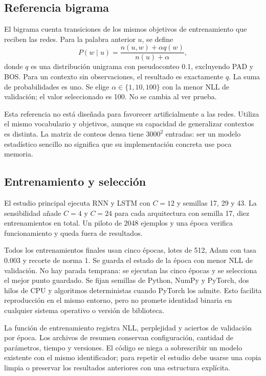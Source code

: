 \subsection{Referencia bigrama}
El bigrama cuenta transiciones de los mismos objetivos de entrenamiento
que reciben las redes. Para la palabra anterior $u$, se define
\begin{equation}
 P(w\mid u)=\frac{n(u,w)+\alpha q(w)}{n(u)+\alpha},
\end{equation}
donde $q$ es una distribución unigrama con pseudoconteo 0.1,
excluyendo PAD y BOS. Para un contexto sin observaciones, el resultado
es exactamente $q$. La suma de probabilidades es uno. Se elige
$\alpha\in\{1,10,100\}$ con la menor NLL de validación;
el valor seleccionado es 100. No se cambia al ver prueba.

Esta referencia no está diseñada para favorecer artificialmente a las
redes. Utiliza el mismo vocabulario y objetivos, aunque su capacidad
de generalizar contextos es distinta. La matriz de conteos densa tiene
$3000^2$ entradas: ser un modelo estadístico sencillo no significa
que su implementación concreta use poca memoria.

\subsection{Entrenamiento y selección}
El estudio principal ejecuta RNN y LSTM con $C=12$ y semillas 17,
29 y 43. La sensibilidad añade $C=4$ y $C=24$ para cada arquitectura
con semilla 17, diez entrenamientos en total. Un piloto de 2048
ejemplos y una época verifica funcionamiento y queda fuera de resultados.

Todos los entrenamientos finales usan cinco épocas, lotes de 512,
Adam con tasa 0.003 y recorte de norma 1. Se guarda el estado de la
época con menor NLL de validación. No hay parada temprana: se
ejecutan las cinco épocas y se selecciona el mejor punto guardado.
Se fijan semillas de Python, NumPy y PyTorch, dos hilos de CPU y
algoritmos deterministas cuando PyTorch los admite. Esto facilita
reproducción en el mismo entorno, pero no promete identidad binaria
en cualquier sistema operativo o versión de biblioteca.

La función de entrenamiento registra NLL, perplejidad y aciertos de
validación por época. Los archivos de resumen conservan configuración,
cantidad de parámetros, tiempo y versiones. El código se niega a
sobrescribir un modelo existente con el mismo identificador; para
repetir el estudio debe usarse una copia limpia o preservar los
resultados anteriores con una estructura explícita.


